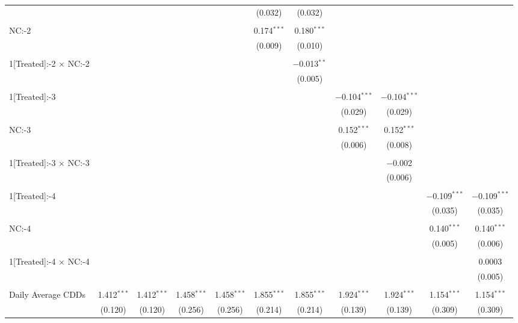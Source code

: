 \begin{table}[!htbp]
\begin{tabular}{@{\extracolsep{5pt}}lcccccccccc}
  &  &  &  &  & (0.032) & (0.032) &  &  &  &  \\ 
  & & & & & & & & & & \\ 
 NC:-2 &  &  &  &  & 0.174$^{***}$ & 0.180$^{***}$ &  &  &  &  \\ 
  &  &  &  &  & (0.009) & (0.010) &  &  &  &  \\ 
  & & & & & & & & & & \\ 
 1[Treated]:-2 $\times$ NC:-2 &  &  &  &  &  & $-$0.013$^{**}$ &  &  &  &  \\ 
  &  &  &  &  &  & (0.005) &  &  &  &  \\ 
  & & & & & & & & & & \\ 
 1[Treated]:-3 &  &  &  &  &  &  & $-$0.104$^{***}$ & $-$0.104$^{***}$ &  &  \\ 
  &  &  &  &  &  &  & (0.029) & (0.029) &  &  \\ 
  & & & & & & & & & & \\ 
 NC:-3 &  &  &  &  &  &  & 0.152$^{***}$ & 0.152$^{***}$ &  &  \\ 
  &  &  &  &  &  &  & (0.006) & (0.008) &  &  \\ 
  & & & & & & & & & & \\ 
 1[Treated]:-3 $\times$ NC:-3 &  &  &  &  &  &  &  & $-$0.002 &  &  \\ 
  &  &  &  &  &  &  &  & (0.006) &  &  \\ 
  & & & & & & & & & & \\ 
 1[Treated]:-4 &  &  &  &  &  &  &  &  & $-$0.109$^{***}$ & $-$0.109$^{***}$ \\ 
  &  &  &  &  &  &  &  &  & (0.035) & (0.035) \\ 
  & & & & & & & & & & \\ 
 NC:-4 &  &  &  &  &  &  &  &  & 0.140$^{***}$ & 0.140$^{***}$ \\ 
  &  &  &  &  &  &  &  &  & (0.005) & (0.006) \\ 
  & & & & & & & & & & \\ 
 1[Treated]:-4 $\times$ NC:-4 &  &  &  &  &  &  &  &  &  & 0.0003 \\ 
  &  &  &  &  &  &  &  &  &  & (0.005) \\ 
  & & & & & & & & & & \\ 
 Daily Average CDDs & 1.412$^{***}$ & 1.412$^{***}$ & 1.458$^{***}$ & 1.458$^{***}$ & 1.855$^{***}$ & 1.855$^{***}$ & 1.924$^{***}$ & 1.924$^{***}$ & 1.154$^{***}$ & 1.154$^{***}$ \\ 
  & (0.120) & (0.120) & (0.256) & (0.256) & (0.214) & (0.214) & (0.139) & (0.139) & (0.309) & (0.309) \\ 

\end{tabular}
\end{table}
